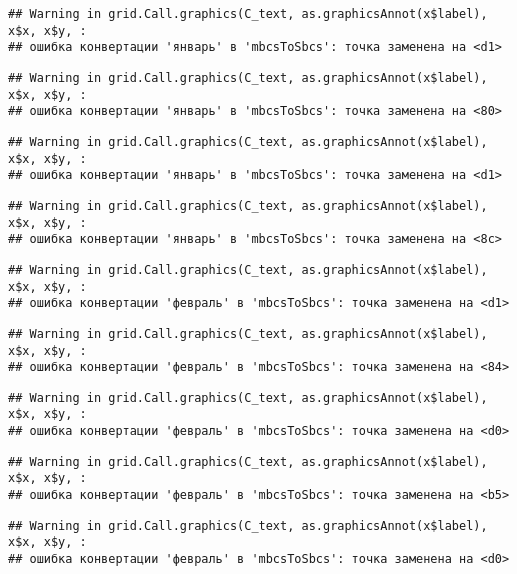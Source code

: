 \documentclass[
]{article}
\begin{document}
\begin{verbatim}
## Warning in grid.Call.graphics(C_text, as.graphicsAnnot(x$label), x$x, x$y, :
## ошибка конвертации 'январь' в 'mbcsToSbcs': точка заменена на <d1>
\end{verbatim}

\begin{verbatim}
## Warning in grid.Call.graphics(C_text, as.graphicsAnnot(x$label), x$x, x$y, :
## ошибка конвертации 'январь' в 'mbcsToSbcs': точка заменена на <80>
\end{verbatim}

\begin{verbatim}
## Warning in grid.Call.graphics(C_text, as.graphicsAnnot(x$label), x$x, x$y, :
## ошибка конвертации 'январь' в 'mbcsToSbcs': точка заменена на <d1>
\end{verbatim}

\begin{verbatim}
## Warning in grid.Call.graphics(C_text, as.graphicsAnnot(x$label), x$x, x$y, :
## ошибка конвертации 'январь' в 'mbcsToSbcs': точка заменена на <8c>
\end{verbatim}

\begin{verbatim}
## Warning in grid.Call.graphics(C_text, as.graphicsAnnot(x$label), x$x, x$y, :
## ошибка конвертации 'февраль' в 'mbcsToSbcs': точка заменена на <d1>
\end{verbatim}

\begin{verbatim}
## Warning in grid.Call.graphics(C_text, as.graphicsAnnot(x$label), x$x, x$y, :
## ошибка конвертации 'февраль' в 'mbcsToSbcs': точка заменена на <84>
\end{verbatim}

\begin{verbatim}
## Warning in grid.Call.graphics(C_text, as.graphicsAnnot(x$label), x$x, x$y, :
## ошибка конвертации 'февраль' в 'mbcsToSbcs': точка заменена на <d0>
\end{verbatim}

\begin{verbatim}
## Warning in grid.Call.graphics(C_text, as.graphicsAnnot(x$label), x$x, x$y, :
## ошибка конвертации 'февраль' в 'mbcsToSbcs': точка заменена на <b5>
\end{verbatim}

\begin{verbatim}
## Warning in grid.Call.graphics(C_text, as.graphicsAnnot(x$label), x$x, x$y, :
## ошибка конвертации 'февраль' в 'mbcsToSbcs': точка заменена на <d0>
\end{verbatim}
\end{document}
